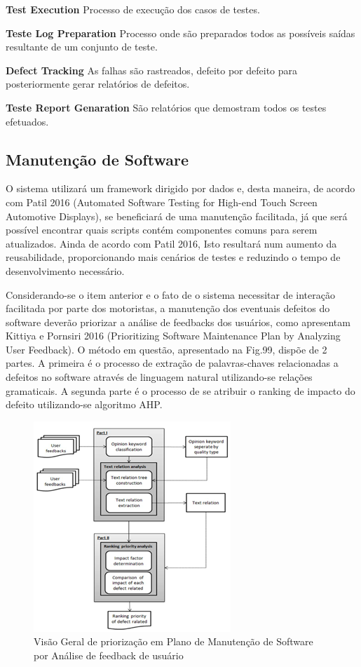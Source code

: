 \documentclass[12pt]{article}
\begin{document}
\textbf{Test Execution}
Processo de execução dos casos de testes.

\textbf{Teste Log Preparation}
Processo onde são preparados todos as possíveis saídas resultante de um conjunto de teste.

\textbf{Defect Tracking}
As falhas são rastreados, defeito por defeito para posteriormente gerar relatórios de defeitos.

\textbf{Teste Report Genaration}
São relatórios que demostram todos os testes efetuados.


\subsection{Manutenção de Software}

O sistema utilizará um framework dirigido por dados e, desta maneira, de acordo com Patil 2016 (Automated Software Testing for High-end Touch Screen Automotive Displays), se beneficiará de uma manutenção facilitada, já que será possível encontrar quais scripts contém componentes comuns para serem atualizados. Ainda de acordo com Patil 2016, Isto resultará num aumento da reusabilidade, proporcionando mais cenários de testes e reduzindo o tempo de desenvolvimento necessário.

Considerando-se o item anterior e o fato de o sistema necessitar de interação facilitada por parte dos motoristas, a manutenção dos eventuais defeitos do software deverão priorizar a análise de feedbacks dos usuários, como apresentam Kittiya e Pornsiri 2016 (Prioritizing Software Maintenance Plan by Analyzing User Feedback). O método em questão, apresentado na Fig.99, dispõe de 2 partes. A primeira é o processo de extração de palavras-chaves relacionadas a defeitos no software através de linguagem natural utilizando-se relações gramaticais. A segunda parte é o processo de se atribuir o ranking de impacto do defeito utilizando-se algoritmo AHP.


\begin{figure}[ht]
\includegraphics[scale=.8, center] {swebok_manutencao.png}
\caption{Visão Geral de priorização em Plano de Manutenção de Software por Análise de feedback de usuário}
\label{fig:exampleFig2}
\end{figure}
\end{document}
